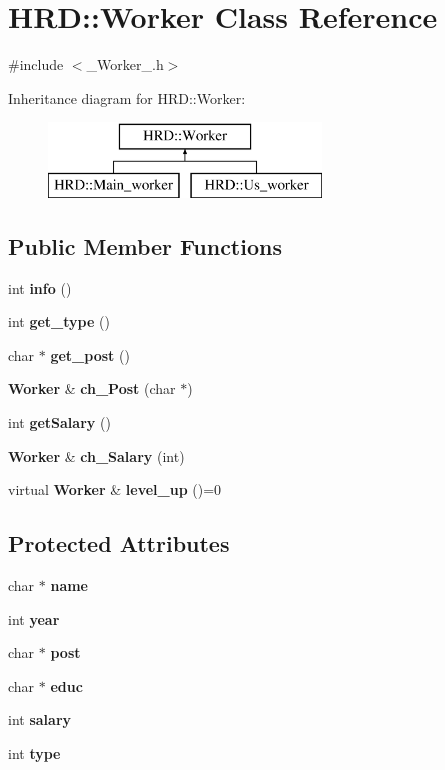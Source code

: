 \section{H\+RD\+:\+:Worker Class Reference}
\label{class_h_r_d_1_1_worker}


{\ttfamily \#include $<$\+\_\+\+Worker\+\_\+.\+h$>$}

Inheritance diagram for H\+RD\+:\+:Worker\+:\begin{figure}[H]
\begin{center}
\leavevmode
\includegraphics[height=2.000000cm]{class_h_r_d_1_1_worker}
\end{center}
\end{figure}
\subsection*{Public Member Functions}
\begin{DoxyCompactItemize}
\item 
int \textbf{ info} ()
\item 
int \textbf{ get\+\_\+type} ()
\item 
char $\ast$ \textbf{ get\+\_\+post} ()
\item 
\textbf{ Worker} \& \textbf{ ch\+\_\+\+Post} (char $\ast$)
\item 
int \textbf{ get\+Salary} ()
\item 
\textbf{ Worker} \& \textbf{ ch\+\_\+\+Salary} (int)
\item 
virtual \textbf{ Worker} \& \textbf{ level\+\_\+up} ()=0
\end{DoxyCompactItemize}
\subsection*{Protected Attributes}
\begin{DoxyCompactItemize}
\item 
char $\ast$ \textbf{ name}
\item 
int \textbf{ year}
\item 
char $\ast$ \textbf{ post}
\item 
char $\ast$ \textbf{ educ}
\item 
int \textbf{ salary}
\item 
int \textbf{ type}
\end{DoxyCompactItemize}


